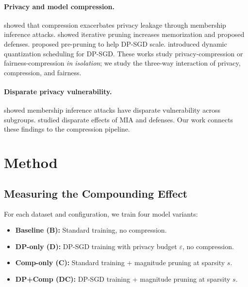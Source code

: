 \documentclass{article}
\begin{document}
\paragraph{Privacy and model compression.}
\citet{li2025compleak} showed that compression exacerbates privacy leakage through membership inference attacks. \citet{shang2025wemem} showed iterative pruning increases memorization and proposed defenses. \citet{adamczewski2023prepruning} proposed pre-pruning to help DP-SGD scale. \citet{gao2025dpquant} introduced dynamic quantization scheduling for DP-SGD. These works study privacy-compression or fairness-compression \emph{in isolation}; we study the three-way interaction of privacy, compression, and fairness.

\paragraph{Disparate privacy vulnerability.}
\citet{kulynych2019disparate} showed membership inference attacks have disparate vulnerability across subgroups. \citet{chang2022understanding} studied disparate effects of MIA and defenses. Our work connects these findings to the compression pipeline.

\section{Method}
\label{sec:method}

\subsection{Measuring the Compounding Effect}
\label{sec:method_cr}

For each dataset and configuration, we train four model variants:
\begin{itemize}
    \item \textbf{Baseline (B):} Standard training, no compression.
    \item \textbf{DP-only (D):} DP-SGD training with privacy budget $\varepsilon$, no compression.
    \item \textbf{Comp-only (C):} Standard training + magnitude pruning at sparsity $s$.
    \item \textbf{DP+Comp (DC):} DP-SGD training + magnitude pruning at sparsity $s$.
\end{itemize}
\end{document}
